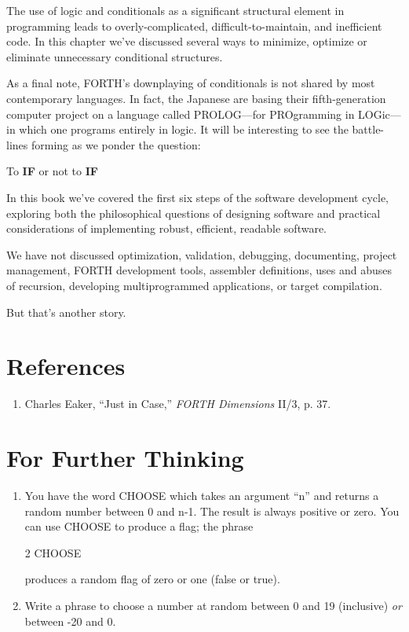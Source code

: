 The use of logic and conditionals as a significant structural element in
programming leads to overly-complicated, difficult-to-maintain, and
inefficient code. In this chapter we've discussed several ways to minimize,
optimize or eliminate unnecessary conditional structures.

As a final note, FORTH's downplaying of conditionals is not shared
by most contemporary languages. In fact, the Japanese are basing their
fifth-generation computer project on a language called PROLOG---for
PROgramming in LOGic---in which one programs entirely in logic. It will
be interesting to see the battle-lines forming as we ponder the question:

To \textbf{IF} or not to \textbf{IF}

In this book we've covered the first six steps of the software development
cycle, exploring both the philosophical questions of designing software
and practical considerations of implementing robust, efficient, readable
software.

We have not discussed optimization, validation, debugging, documenting,
project management, FORTH development tools, assembler
definitions, uses and abuses of recursion, developing multiprogrammed
applications, or target compilation.

But that's another story.

\section{References}

\begin{enumerate}
\item Charles Eaker, ``Just in Case,'' \emph{FORTH Dimensions} II/3, p. 37.
\end{enumerate}

\section{For Further Thinking}

\begin{enumerate}
\item You have the word CHOOSE which takes an argument ``n'' and returns a
random number between 0 and n-1. The result is always positive or zero.
You can use CHOOSE to produce a flag; the phrase
\begin{Code}
2 CHOOSE
\end{Code}
produces a random flag of zero or one (false or true).

\item Write a phrase to choose a number at random between 0 and 19 (inclusive)
\emph{or} between -20 and 0.
\end{enumerate}
